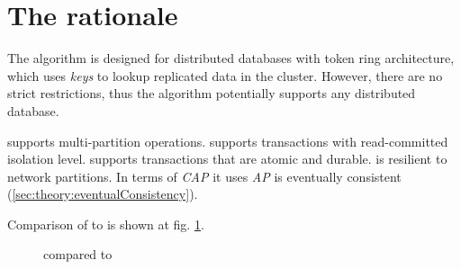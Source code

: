 
\section{The rationale}
The \mpt algorithm is designed for distributed databases with token ring architecture,
which uses \emph{keys} to lookup replicated data in the cluster. However, there are no strict restrictions, thus the algorithm potentially supports any distributed database.

\mpt supports multi-partition operations.
\mpt supports transactions with read-committed isolation level. 
\mpt supports transactions that are atomic and durable.
\mpt is resilient to network partitions. In terms of \emph{CAP} \cite{Brewer:2012ba} it uses \emph{AP}
\mpt is eventually consistent (\ref{sec:theory:eventualConsistency}). 

Comparison of \mpt to \lwt is shown at fig. \ref{fig:mppVsLwt}.

\begin{figure}[hbt]
  \setlength{\unitlength}{1.3cm}  
  \caption{\mpt compared to \lwt}
  \label{fig:mppVsLwt}
\end{figure}





